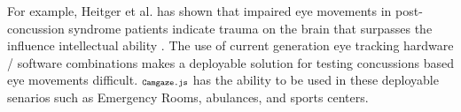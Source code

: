 \documentclass[annual]{acmsiggraph}
\newcommand{\Acronym}[1]{\ensuremath{{\small{\texttt{#1}}}}}
\newcommand{\Name}{\Acronym{Camgaze.js}} \newcommand{\False}{\Constant{false}}
\newcommand{\Constant}[1]{\ensuremath{\small{\texttt{#1}}}}
\begin{document}
For example, Heitger et al. has shown that impaired eye movements in
post-concussion syndrome patients indicate trauma on the brain that surpasses
the influence intellectual ability \cite{Heitger2009}. The use of current
generation eye tracking hardware / software combinations makes a deployable
solution for testing concussions based eye movements difficult. $\Name$ has the
ability to be used in these deployable senarios such as Emergency Rooms,
abulances, and sports centers.



\end{document}
